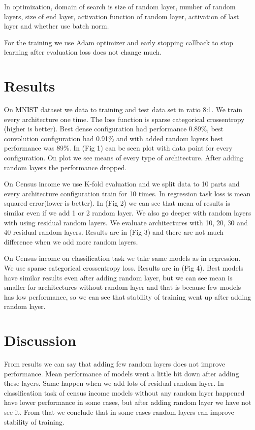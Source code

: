 \documentclass[]{article}
\begin{document}
\begin{multicols}{2}
	In optimization, domain of search is size of random layer, number of random layers, size of end layer, activation function of random layer, activation of last layer and whether use batch norm.	
	
	For the training we use Adam optimizer and early stopping callback to stop learning after evaluation loss does not change much.
	
	
	\section{Results}
	On MNIST dataset we data to training and test data set in ratio 8:1. We train every architecture one time. The loss function is sparse categorical crossentropy (higher is better). Best dense configuration had performance 0.89\%, best convolution configuration had 0.91\% and with added random layers best performance was 89\%. In (Fig 1) can be seen plot with data point for every configuration. On plot we see means of every type of architecture. After adding random layers the performance dropped.
	
	On Census income we use K-fold evaluation and we split data to 10 parts and every architecture configuration train for 10 times. In regression task loss is mean squared error(lower is better). In (Fig 2) we can see that mean of results is similar even if we add 1 or 2 random layer. We also go deeper with random layers with using residual random layers. We evaluate architectures with 10, 20, 30 and 40 residual random layers. Results are in (Fig 3) and there are not much difference when we add more random layers.
	
	On Census income on classification task we take same models as in regression. We use sparse categorical crossentropy loss. Results are in (Fig 4). Best models have similar results even after adding random layer, but we can see mean is smaller for architectures without random layer and that is because few models has low performance, so we can see that stability of training went up after adding random layer.
	
	\section{Discussion}
	From results we can say that adding few random layers does not improve performance. Mean performance of models went a little bit down after adding these layers. Same happen when we add lots of residual random layer. In classification task of census income models without any random layer happened have lower performance in some cases, but after adding random layer we have not see it. From that we conclude that in some cases random layers can improve stability of training.
	

\end{multicols}
\end{document}
